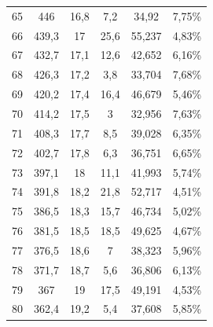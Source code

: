 \begin{longtable}[H]{cccccc}
  65          & 446                  & 16,8          & 7,2            & 34,92         & 7,75\%                             \\
  66          & 439,3                & 17            & 25,6           & 55,237        & 4,83\%                             \\
  67          & 432,7                & 17,1          & 12,6           & 42,652        & 6,16\%                             \\
  68          & 426,3                & 17,2          & 3,8            & 33,704        & 7,68\%                             \\
  69          & 420,2                & 17,4          & 16,4           & 46,679        & 5,46\%                             \\
  70          & 414,2                & 17,5          & 3              & 32,956        & 7,63\%                             \\
  71          & 408,3                & 17,7          & 8,5            & 39,028        & 6,35\%                             \\
  72          & 402,7                & 17,8          & 6,3            & 36,751        & 6,65\%                             \\
  73          & 397,1                & 18            & 11,1           & 41,993        & 5,74\%                             \\
  74          & 391,8                & 18,2          & 21,8           & 52,717        & 4,51\%                             \\
  75          & 386,5                & 18,3          & 15,7           & 46,734        & 5,02\%                             \\
  76          & 381,5                & 18,5          & 18,5           & 49,625        & 4,67\%                             \\
  77          & 376,5                & 18,6          & 7              & 38,323        & 5,96\%                             \\
  78          & 371,7                & 18,7          & 5,6            & 36,806        & 6,13\%                             \\
  79          & 367                  & 19            & 17,5           & 49,191        & 4,53\%                             \\
  80          & 362,4                & 19,2          & 5,4            & 37,608        & 5,85\%                             \\

\end{longtable}
